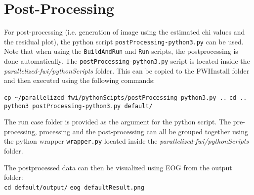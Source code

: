 \documentclass[10pt]{article}
\begin{document}

\section{Post-Processing}
For post-processing (i.e. generation of image using the estimated chi values and the residual plot), the python script \texttt{postProcessing-python3.py} can be used. Note that when using the \texttt{BuildAndRun} and \texttt{Run} scripts, the postprocessing is done automatically. The \texttt{postProcessing-python3.py} script is located inside the \textit{parallelized-fwi/pythonScripts} folder. This can be copied to the FWIInstall folder and then executed using 
the following commands:
\newline

\texttt{cp \textasciitilde/parallelized-fwi/pythonScipts/postProcessing-python3.py ..} \newline
\texttt{cd ..} \newline
\texttt{python3 postProcessing-python3.py default/} 
\newline

The run case folder is provided as the argument for the python script. The pre-processing, processing and the post-processing can all be grouped together using the python wrapper \texttt{wrapper.py} located inside the \textit{parallelized-fwi/pythonScripts} folder.
\newline

\noindent The postprocessed data can then be visualized using EOG from the output folder: \\ \newline
\texttt{cd default/output/} \newline
\texttt{eog defaultResult.png}
\newline
 
\end{document}
